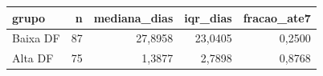 \begin{tabular}{lrrrr}
\hline
grupo & n & mediana\_dias & iqr\_dias & fracao\_ate7 \\
\hline
Baixa DF & 87 & 27,8958 & 23,0405 & 0,2500 \\
Alta DF & 75 & 1,3877 & 2,7898 & 0,8768 \\
\hline
\end{tabular}
